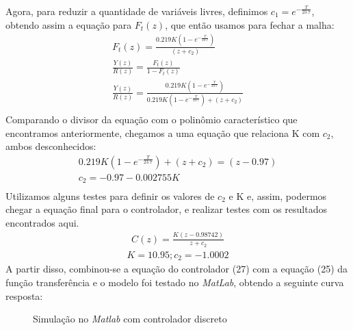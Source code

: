 \documentclass[
	article,			%
	11pt,				%
	oneside,			%
	a4paper,			%
	section=TITLE,		%
	english,			%
	brazil,				%
	sumario=tradicional
	]{abntex2}
\begin{document}
Agora, para reduzir a quantidade de variáveis livres, definimos $c_1=e^{-\frac{T}{23.7}}$, obtendo assim a equação para $F_t(z)$, que então usamos para fechar a malha:
\begin{equation}
\begin{split}
    F_t(z)=\frac{0.219K(1-e^{-\frac{T}{23.7}})}{(z+c_2)} \\
    \frac{Y(z)}{R(z)}=\frac{F_t(z)}{1-F_t(z)} \\
    \frac{Y(z)}{R(z)}=\frac{0.219K(1-e^{-\frac{T}{23.7}})}{0.219K(1-e^{-\frac{T}{23.7}})+(z+c_2)} \\
\end{split}
\end{equation}
Comparando o divisor da equação com o polinômio característico que encontramos anteriormente, chegamos a uma equação que relaciona K com $c_2$, ambos desconhecidos:
\begin{equation}
\begin{split}
   0.219K(1-e^{-\frac{T}{23.7}})+(z+c_2) = (z-0.97) \\
   c_2=-0.97-0.002755K \\
\end{split}
\end{equation}
Utilizamos alguns testes para definir os valores de $c_2$ e K e, assim, podermos chegar a equação final para o controlador, e realizar testes com os resultados encontrados aqui.
\begin{equation}
\begin{split}
   C(z)=\frac{K(z-0.98742)}{z+c_2}
\end{split}
\end{equation}
\begin{equation}
\begin{split}
     K= 10.95 ; c_2= -1.0002
\end{split}
\end{equation}
A partir disso, combinou-se a equação do controlador (27) com a equação (25) da função transferência e o modelo foi testado no \textit{MatLab}, obtendo a seguinte curva resposta:
\begin{figure}[H]
    \centering
    \caption{Simulação no \textit{Matlab} com controlador discreto}
    \label{fig:res-discreto}
    \end{figure}
    
\end{document}
